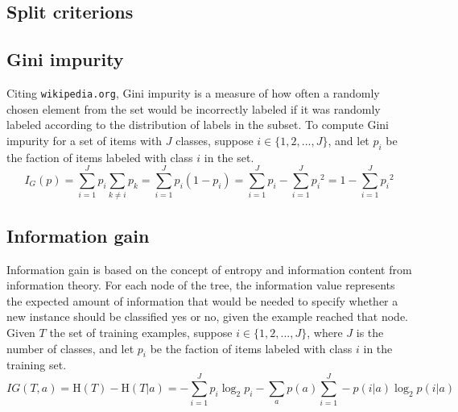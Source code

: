 \documentclass[11pt, a4paper]{article}
\begin{document}
\newpage
\begin{appendix}
  \section{Split criterions}
    \label{appendix:splitcriterions}
    \subsection{Gini impurity}
      Citing \texttt{wikipedia.org}, Gini impurity is a measure of how often a randomly chosen element from the set would be incorrectly labeled if it was randomly labeled according to the distribution of labels in the subset. To compute Gini impurity for a set of items with $J$ classes, suppose $i\in\{1,2,...,J\}$, and let $p_{i}$ be the faction of items labeled with class $i$ in the set.
      \[{I} _{G}(p)=\sum _{i=1}^{J}p_{i}\sum _{k\neq i}p_{k}=\sum _{i=1}^{J}p_{i}(1-p_{i})=\sum _{i=1}^{J}p_{i}-\sum _{i=1}^{J}{p_{i}}^{2}=1-\sum _{i=1}^{J}{p_{i}}^{2}\]
    \subsection{Information gain}
      Information gain is based on the concept of entropy and information content from information theory. For each node of the tree, the information value represents the expected amount of information that would be needed to specify whether a new instance should be classified yes or no, given the example reached that node. Given $T$ the set of training examples, suppose $i\in\{1,2,...,J\}$, where $J$ is the number of classes, and let $p_{i}$ be the faction of items labeled with class $i$ in the training set.
      \[IG(T, a)=\mathrm{H}(T)-\mathrm{H}(T|a)=-\sum _{i=1}^{J}p_{i}\log _{2}{p_{i}}-\sum _{a}{p(a)\sum _{i=1}^{J}-p(i|a)\log _{2}{p(i|a)}}\]


\end{appendix}
\end{document}
